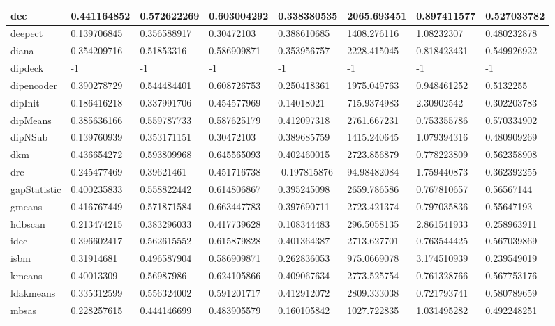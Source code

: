 \begin{table}[H]
\begin{tabular}{|l|l|l|l|l|l|l|l|}
\hline
dec & 0.441164852 & 0.572622269 & 0.603004292 & 0.338380535 & 2065.693451 & 0.897411577 & 0.527033782 \\
\hline
deepect & 0.139706845 & 0.356588917 & 0.30472103 & 0.388610685 & 1408.276116 & 1.08232307 & 0.480232878 \\
\hline
diana & 0.354209716 & 0.51853316 & 0.586909871 & 0.353956757 & 2228.415045 & 0.818423431 & 0.549926922 \\
\hline
dipdeck & -1 & -1 & -1 & -1 & -1 & -1 & -1 \\
\hline
dipencoder & 0.390278729 & 0.544484401 & 0.608726753 & 0.250418361 & 1975.049763 & 0.948461252 & 0.5132255 \\
\hline
dipInit & 0.186416218 & 0.337991706 & 0.454577969 & 0.14018021 & 715.9374983 & 2.30902542 & 0.302203783 \\
\hline
dipMeans & 0.385636166 & 0.559787733 & 0.587625179 & 0.412097318 & 2761.667231 & 0.753355786 & 0.570334902 \\
\hline
dipNSub & 0.139760939 & 0.353171151 & 0.30472103 & 0.389685759 & 1415.240645 & 1.079394316 & 0.480909269 \\
\hline
dkm & 0.436654272 & 0.593809968 & 0.645565093 & 0.402460015 & 2723.856879 & 0.778223809 & 0.562358908 \\
\hline
drc & 0.245477469 & 0.39621461 & 0.451716738 & -0.197815876 & 94.98482084 & 1.759440873 & 0.362392255 \\
\hline
gapStatistic & 0.400235833 & 0.558822442 & 0.614806867 & 0.395245098 & 2659.786586 & 0.767810657 & 0.56567144 \\
\hline
gmeans & 0.416767449 & 0.571871584 & 0.663447783 & 0.397690711 & 2723.421374 & 0.797035836 & 0.55647193 \\
\hline
hdbscan & 0.213474215 & 0.383296033 & 0.417739628 & 0.108344483 & 296.5058135 & 2.861541933 & 0.258963911 \\
\hline
idec & 0.396602417 & 0.562615552 & 0.615879828 & 0.401364387 & 2713.627701 & 0.763544425 & 0.567039869 \\
\hline
isbm & 0.31914681 & 0.496587904 & 0.586909871 & 0.262836053 & 975.0669078 & 3.174510939 & 0.239549019 \\
\hline
kmeans & 0.40013309 & 0.56987986 & 0.624105866 & 0.409067634 & 2773.525754 & 0.761328766 & 0.567753176 \\
\hline
ldakmeans & 0.335312599 & 0.556324002 & 0.591201717 & 0.412912072 & 2809.333038 & 0.721793741 & 0.580789659 \\
\hline
mbsas & 0.228257615 & 0.444146699 & 0.483905579 & 0.160105842 & 1027.722835 & 1.031495282 & 0.492248251 \\

\end{tabular}
\end{table}
